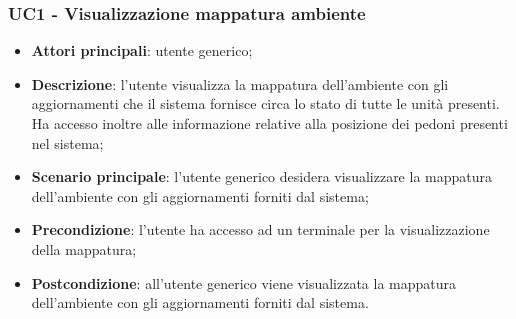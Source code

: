 \subsubsection{UC1 - Visualizzazione mappatura ambiente}
\begin{itemize}
		\item \textbf{Attori principali}: utente generico;
		\item \textbf{Descrizione}: l'utente visualizza la mappatura dell'ambiente con gli aggiornamenti  che il sistema fornisce circa lo stato di tutte le unità presenti. Ha accesso inoltre alle informazione relative alla posizione dei pedoni presenti nel sistema;
		\item \textbf{Scenario principale}: l'utente generico desidera visualizzare la mappatura dell'ambiente con gli aggiornamenti  forniti dal sistema; 
		\item \textbf{Precondizione}: l'utente ha accesso ad un terminale per la visualizzazione della mappatura;
		\item \textbf{Postcondizione}: all'utente generico viene visualizzata la mappatura dell'ambiente con gli aggiornamenti  forniti dal sistema. 
\end{itemize}